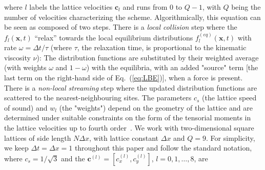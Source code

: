 where $l$ labels the lattice velocities $\mathbf{c}_l$ and runs from $0$ to $Q-1$, with $Q$ being the number of velocities characterizing the scheme.
Algorithmically, this equation can be seen as composed of two steps. 
There is a \textit{local collision} step where the $f_l(\mathbf{x},t)$ ``relax'' towards the local equilibrium distributions $f^{(eq)}_l(\mathbf{x},t)$ with rate $\omega = \Delta t/\tau$ (where $\tau$, the relaxation time, is proportional to the kinematic viscosity $\nu$): The distribution functions are substituted by their weighted average (with weights $\omega$ and $1-\omega$) with the equilibria, with an added "source" term [the last term on the right-hand side of Eq.~(\ref{eq:LBE})], when a force is present. 
There is a \textit{non-local streaming} step where the updated distribution functions are scattered to the nearest-neighbouring sites. 
The parameters $c_s$ (the lattice speed of sound) and $w_l$ (the "weights") depend on the geometry of the lattice and are determined under suitable constraints on the form of the tensorial moments in the lattice velocities up to fourth order~\cite{wolf-gladrowLatticeGasCellularAutomata2004}.
We work with two-dimensional square lattices of side length $N\Delta x$, with lattice constant $\Delta x$ and $Q=9$.
For simplicity, we keep $\Delta t=\Delta x=1$ throughout this paper and follow the standard notation, where $c_s = 1/\sqrt{3}$ and the $\mathbf{c}^{(l)} = [c^{(l)}_x,c^{(l)}_y]$, $l=0,1,\dots,8$, are~\cite{qianFractionalPropagationElimination1997,shanLatticeBoltzmannModel1993} 

